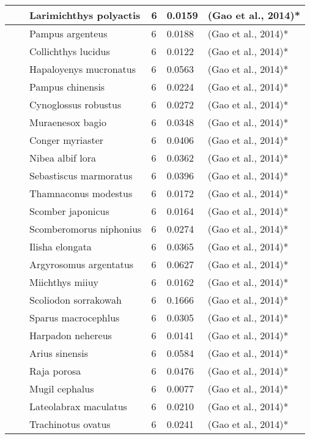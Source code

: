 \begin{center}
\begin{longtable}{ | p{2cm} | p{1.4cm} | p{3cm} | p{1.6cm} | p{1.9cm} | p{2.6cm} | }
 &  & Larimichthys polyactis & 6 & 0.0159 & (Gao et al., 2014)*  \\ \hline
 &  & Pampus argenteus & 6 & 0.0188 & (Gao et al., 2014)*  \\ \hline
 &  & Collichthys lucidus & 6 & 0.0122 & (Gao et al., 2014)*  \\ \hline
 &  & Hapaloyenys mucronatus & 6 & 0.0563 & (Gao et al., 2014)*  \\ \hline
 &  & Pampus chinensis & 6 & 0.0224 & (Gao et al., 2014)*  \\ \hline
 &  & Cynoglossus robustus & 6 & 0.0272 & (Gao et al., 2014)*  \\ \hline
 &  & Muraenesox bagio & 6 & 0.0348 & (Gao et al., 2014)*  \\ \hline
 &  & Conger myriaster & 6 & 0.0406 & (Gao et al., 2014)*  \\ \hline
 &  & Nibea albif lora & 6 & 0.0362 & (Gao et al., 2014)*  \\ \hline
 &  & Sebastiscus marmoratus & 6 & 0.0396 & (Gao et al., 2014)*  \\ \hline
 &  & Thamnaconus modestus & 6 & 0.0172 & (Gao et al., 2014)*  \\ \hline
 &  & Scomber japonicus & 6 & 0.0164 & (Gao et al., 2014)*  \\ \hline
 &  & Scomberomorus niphonius & 6 & 0.0274 & (Gao et al., 2014)*  \\ \hline
 &  & Ilisha elongata & 6 & 0.0365 & (Gao et al., 2014)*  \\ \hline
 &  & Argyrosomus argentatus & 6 & 0.0627 & (Gao et al., 2014)*  \\ \hline
 &  & Miichthys miiuy & 6 & 0.0162 & (Gao et al., 2014)*  \\ \hline
 &  & Scoliodon sorrakowah & 6 & 0.1666 & (Gao et al., 2014)*  \\ \hline
 &  & Sparus macrocephlus & 6 & 0.0305 & (Gao et al., 2014)*  \\ \hline
 &  & Harpadon nehereus & 6 & 0.0141 & (Gao et al., 2014)*  \\ \hline
 &  & Arius sinensis & 6 & 0.0584 & (Gao et al., 2014)*  \\ \hline
 &  & Raja porosa & 6 & 0.0476 & (Gao et al., 2014)*  \\ \hline
 &  & Mugil cephalus & 6 & 0.0077 & (Gao et al., 2014)*  \\ \hline
 &  & Lateolabrax maculatus & 6 & 0.0210 & (Gao et al., 2014)*  \\ \hline
 &  & Trachinotus ovatus & 6 & 0.0241 & (Gao et al., 2014)*  \\ \hline

\end{longtable}
\end{center}
